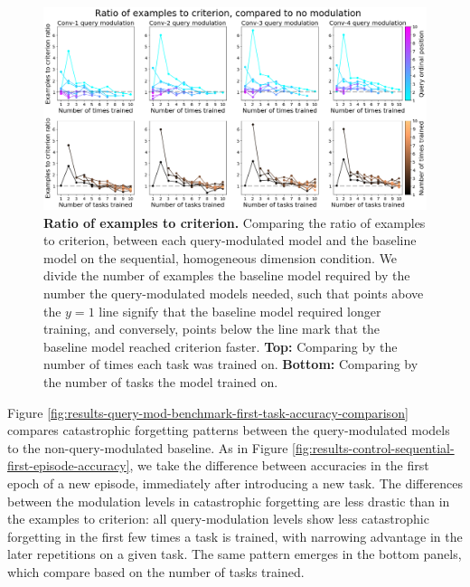 \begin{figure}[!htb]
\centering
\includegraphics[width=\linewidth]{ch-results/figures/query_mod_benchmark/examples_to_criterion_comparison.png}
\caption{ {\bf Ratio of examples to criterion.} Comparing the ratio of examples to criterion, between each query-modulated model and the baseline model on the sequential, homogeneous dimension condition. We divide the number of examples the baseline model required by the number the query-modulated models needed, such that points above the $y=1$ line signify that the baseline model required longer training, and conversely, points below the line mark that the baseline model reached criterion faster. \textbf{Top:} Comparing by the number of times each task was trained on. \textbf{Bottom:} Comparing by the number of tasks the model trained on.}
\label{fig:results-query-mod-benchmark-examples-to-criterion-comparison}
\end{figure}

Figure \ref{fig:results-query-mod-benchmark-first-task-accuracy-comparison} compares catastrophic forgetting patterns between the query-modulated models to the non-query-modulated baseline. As in Figure \ref{fig:results-control-sequential-first-episode-accuracy}, we take the difference between accuracies in the first epoch of a new episode, immediately after introducing a new task. The differences between the modulation levels in catastrophic forgetting are less drastic than in the examples to criterion: all query-modulation levels show less catastrophic forgetting in the first few times a task is trained, with narrowing advantage in the later repetitions on a given task. The same pattern emerges in the bottom panels, which compare based on the number of tasks trained.

